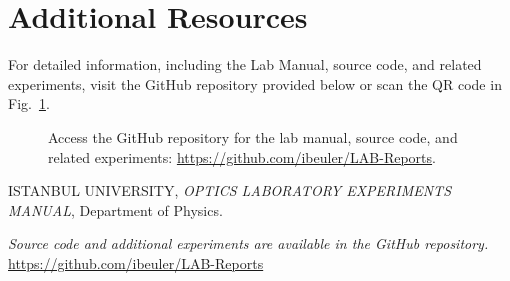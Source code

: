 \documentclass[journal]{IEEEtran}
\begin{document}
\section{Additional Resources}
For detailed information, including the Lab Manual, source code, and related experiments, visit the GitHub repository provided below or scan the QR code in Fig.~\ref{fig:qr_code}.

\begin{figure}[H]
    \centering
    \begin{minipage}{0.15\textwidth}
        \centering
    \end{minipage}%
    \begin{minipage}{0.2\textwidth}
        \raggedright
        \caption{Access the GitHub repository for the lab manual, source code, and related experiments: \href{https://github.com/ibeuler/LAB-Reports}{\url{https://github.com/ibeuler/LAB-Reports}}.}
        \label{fig:qr_code}
    \end{minipage}
\end{figure}

\begin{thebibliography}{9}
    ISTANBUL UNIVERSITY, \textit{OPTICS LABORATORY
    EXPERIMENTS MANUAL}, Department of Physics.

    \textit{Source code and additional experiments are available in the GitHub repository.} \url{https://github.com/ibeuler/LAB-Reports}
\end{thebibliography}
\end{document}
